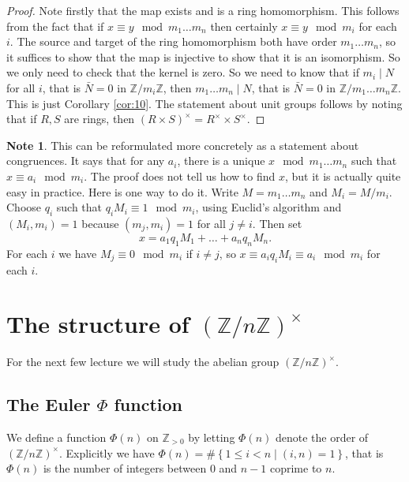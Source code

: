 \documentclass{article}
\newcommand{\Z}{\mathbb{Z}}
\newcommand{\rb}[1]{\left( #1 \right)}
\newcommand{\cb}[1]{\left\{ #1 \right\}}
\newcommand{\unit}[1]{\rb{\Z / #1\Z}^\times}
\theoremstyle{definition}\newtheorem{definition}{Definition}
\theoremstyle{definition}\newtheorem*{remark}{Remark}
\theoremstyle{definition}\newtheorem*{example}{Example}
\theoremstyle{definition}\newtheorem*{note}{Note}
\begin{document}
\begin{proof}
Note firstly that the map exists and is a ring homomorphism. This follows from the fact that if $ x \equiv y \mod m_1 \dots m_n $ then certainly $ x \equiv y \mod m_i $ for each $ i $. The source and target of the ring homomorphism both have order $ m_1 \dots m_n $, so it suffices to show that the map is injective to show that it is an isomorphism. So we only need to check that the kernel is zero. So we need to know that if $ m_i \mid N $ for all $ i $, that is $ \bar{N} = 0 $ in $ \Z / m_i\Z $, then $ m_1 \dots m_n \mid N $, that is $ \bar{N} = 0 $ in $ \Z / m_1 \dots m_n\Z $. This is just Corollary \ref{cor:10}. The statement about unit groups follows by noting that if $ R, S $ are rings, then $ \rb{R \times S}^\times = R^\times \times S^\times $.
\end{proof}

\begin{note}
This can be reformulated more concretely as a statement about congruences. It says that for any $ a_i $, there is a unique $ x \mod m_1 \dots m_n $ such that $ x \equiv a_i \mod m_i $. The proof does not tell us how to find $ x $, but it is actually quite easy in practice. Here is one way to do it. Write $ M = m_1 \dots m_n $ and $ M_i = M / m_i $. Choose $ q_i $ such that $ q_iM_i \equiv 1 \mod m_i $, using Euclid's algorithm and $ \rb{M_i, m_i} = 1 $ because $ \rb{m_j, m_i} = 1 $ for all $ j \ne i $. Then set
$$ x = a_1q_1M_1 + \dots + a_nq_nM_n. $$
For each $ i $ we have $ M_j \equiv 0 \mod m_i $ if $ i \ne j $, so $ x \equiv a_iq_iM_i \equiv a_i \mod m_i $ for each $ i $.
\end{note}

\section{The structure of $ \unit{n} $}

For the next few lecture we will study the abelian group $ \unit{n} $.

\subsection{The Euler $ \Phi $ function}

We define a function $ \Phi\rb{n} $ on $ \Z_{> 0} $ by letting $ \Phi\rb{n} $ denote the order of $ \unit{n} $. Explicitly we have $ \Phi\rb{n} = \#\cb{1 \le i < n \mid \rb{i, n} = 1} $, that is $ \Phi\rb{n} $ is the number of integers between $ 0 $ and $ n - 1 $ coprime to $ n $.
\end{document}
